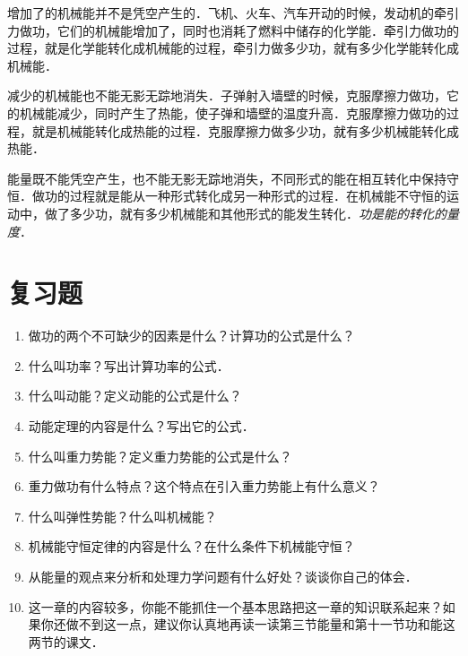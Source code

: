 增加了的机械能并不是凭空产生的．飞机、火车、汽车开动的时候，发动机的牵引力做功，它们的机械能增加了，同时也消耗了燃料中储存的化学能．牵引力做功的过程，就是化学能转化成机械能的过程，牵引力做多少功，就有多少化学能转化成机械能．

减少的机械能也不能无影无踪地消失．子弹射入墙壁的时候，克服摩擦力做功，它的机械能减少，同时产生了热能，使子弹和墙壁的温度升高．克服摩擦力做功的过程，就是机械能转化成热能的过程．克服摩擦力做多少功，就有多少机械能转化成热能．

能量既不能凭空产生，也不能无影无踪地消失，不同形式的能在相互转化中保持守恒．做功的过程就是能从一种形式转化成另一种形式的过程．在机械能不守恒的运动中，做了多少功，就有多少机械能和其他形式的能发生转化．\textit{功是能的转化的量度}．

\section*{复习题}
\begin{enumerate}
    \item 做功的两个不可缺少的因素是什么？计算功的公式是什么？
    \item 什么叫功率？写出计算功率的公式．
    \item 什么叫动能？定义动能的公式是什么？
    \item 动能定理的内容是什么？写出它的公式．
    \item 什么叫重力势能？定义重力势能的公式是什么？
    \item 重力做功有什么特点？这个特点在引入重力势能上有什么意义？
    \item 什么叫弹性势能？什么叫机械能？
    \item 机械能守恒定律的内容是什么？在什么条件下机械能守恒？
    \item 从能量的观点来分析和处理力学问题有什么好处？谈谈你自己的体会．
    \item 这一章的内容较多，你能不能抓住一个基本思路把这一章的知识联系起来？如果你还做不到这一点，建议你认真地再读一读第三节能量和第十一节功和能这两节的课文．
\end{enumerate}

